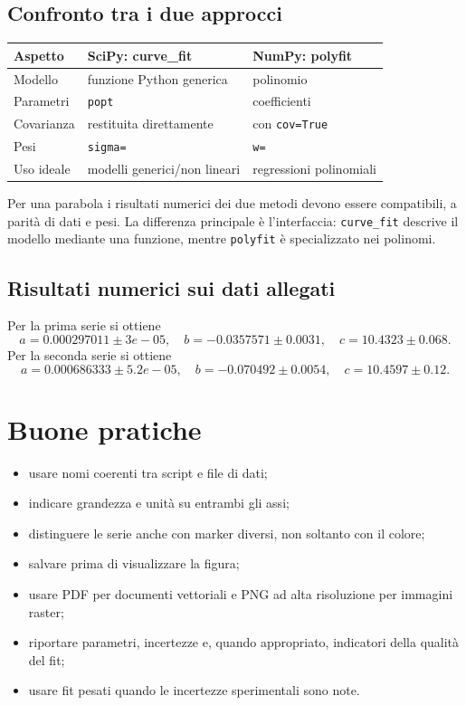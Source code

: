 \documentclass[11pt,a4paper]{book}
\begin{document}
\section{Confronto tra i due approcci}
\begin{center}\begin{tabular}{lll}\toprule
Aspetto & SciPy: curve\_fit & NumPy: polyfit\\\midrule
Modello & funzione Python generica & polinomio\\
Parametri & \texttt{popt} & coefficienti\\
Covarianza & restituita direttamente & con \texttt{cov=True}\\
Pesi & \texttt{sigma=} & \texttt{w=}\\
Uso ideale & modelli generici/non lineari & regressioni polinomiali\\\bottomrule\end{tabular}\end{center}
Per una parabola i risultati numerici dei due metodi devono essere compatibili, a parità di dati e pesi. La differenza principale è l'interfaccia: \texttt{curve\_fit} descrive il modello mediante una funzione, mentre \texttt{polyfit} è specializzato nei polinomi.

\section{Risultati numerici sui dati allegati}
Per la prima serie si ottiene
\[a = 0.000297011 \pm 3e-05,\quad b = -0.0357571 \pm 0.0031,\quad c = 10.4323 \pm 0.068.\]
Per la seconda serie si ottiene
\[a = 0.000686333 \pm 5.2e-05,\quad b = -0.070492 \pm 0.0054,\quad c = 10.4597 \pm 0.12.\]

\chapter{Buone pratiche}
\begin{itemize}
\item usare nomi coerenti tra script e file di dati;
\item indicare grandezza e unità su entrambi gli assi;
\item distinguere le serie anche con marker diversi, non soltanto con il colore;
\item salvare prima di visualizzare la figura;
\item usare PDF per documenti vettoriali e PNG ad alta risoluzione per immagini raster;
\item riportare parametri, incertezze e, quando appropriato, indicatori della qualità del fit;
\item usare fit pesati quando le incertezze sperimentali sono note.
\end{itemize}
\end{document}
